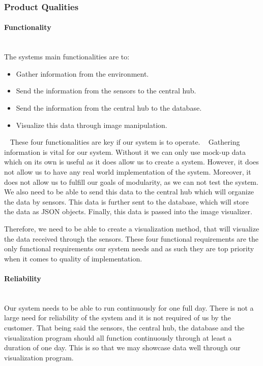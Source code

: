 \documentclass[../document.tex]{subfiles}
\begin{document}
\subsubsection{Product Qualities}

\paragraph{Functionality} \ \\
The systems main functionalities are to:
\begin{itemize}
\item
Gather information from the environment.
\item
Send the information from the sensors to the central hub.
\item
Send the information from the central hub to the database.
\item
Visualize this data through image manipulation.
\end{itemize}
\ \newline
These four functionalities are key if our system is to operate.
\newline \ \newline
Gathering information is vital for our system. Without it we can only use mock-up data which on its own is useful as it does allow us to create a system. However, it does not allow us to have any real world implementation of the system. Moreover, it does not allow us to fulfill our goals of modularity, as we can not test the system. We also need to be able to send this data to the central hub which will organize the data by sensors. This data is further sent to the database, which will store the data as JSON objects. Finally, this data is passed into the image visualizer. 

Therefore, we need to be able to create a visualization method, that will visualize the data received through the sensors. These four functional requirements are the only functional requirements our system needs and as such they are top priority when it comes to quality of implementation.

\paragraph{Reliability} \ \\
Our system needs to be able to run continuously for one full day. There is not a large need for reliability of the system and it is not required of us by the customer. That being said the sensors, the central hub, the database and the visualization program should all function continuously through at least a duration of one day. This is so that we may showcase data well through our visualization program.
\end{document}

